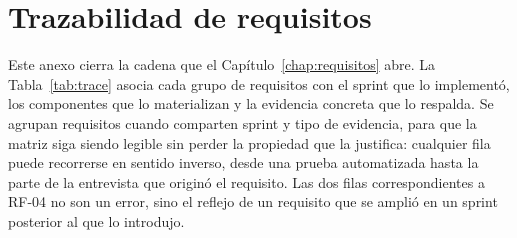\chapter{Trazabilidad de requisitos}
\label{ap:trazabilidad}

Este anexo cierra la cadena que el Capítulo~\ref{chap:requisitos} abre. La Tabla~\ref{tab:trace} asocia cada grupo de requisitos con el sprint que lo implementó, los componentes que lo materializan y la evidencia concreta que lo respalda. Se agrupan requisitos cuando comparten sprint y tipo de evidencia, para que la matriz siga siendo legible sin perder la propiedad que la justifica: cualquier fila puede recorrerse en sentido inverso, desde una prueba automatizada hasta la parte de la entrevista que originó el requisito. Las dos filas correspondientes a RF-04 no son un error, sino el reflejo de un requisito que se amplió en un sprint posterior al que lo introdujo.

